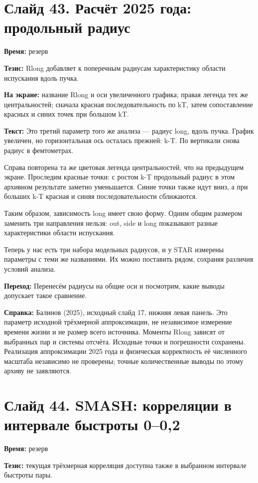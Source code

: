 \documentclass[11pt,a4paper]{article}
\begin{document}
\clearpage
\section*{Слайд 43. Расчёт 2025 года: продольный радиус}
\textbf{Время:} резерв

\textbf{Тезис:} Rlong добавляет к поперечным радиусам характеристику области испускания вдоль пучка.

\textbf{На экране:} название Rlong и оси увеличенного графика; правая легенда тех же центральностей; сначала красная последовательность по kT, затем сопоставление красных и синих точек при большом kT.

\textbf{Текст:} Это третий параметр того же анализа — радиус long, вдоль пучка. График увеличен, но горизонтальная ось осталась прежней: k-T. По вертикали снова радиус в фемтометрах.

Справа повторена та же цветовая легенда центральностей, что на предыдущем экране. Проследим красные точки: с ростом k-T продольный радиус в этом архивном результате заметно уменьшается. Синие точки также идут вниз, а при больших k-T красная и синяя последовательности сближаются.

Таким образом, зависимость long имеет свою форму. Одним общим размером заменить три направления нельзя: out, side и long показывают разные характеристики области испускания.

Теперь у нас есть три набора модельных радиусов, и у STAR измерены параметры с теми же названиями. Их можно поставить рядом, сохраняя различия условий анализа.

\textbf{Переход:} Перенесём радиусы на общие оси и посмотрим, какие выводы допускает такое сравнение.

\textbf{Справка:} Балинов (2025), исходный слайд 17, нижняя левая панель. Это параметр исходной трёхмерной аппроксимации, не независимое измерение времени жизни и не размер всего источника. Моменты Rlong зависят от выбранных пар и системы отсчёта. Исходные точки и погрешности сохранены. Реализация аппроксимации 2025 года и физическая корректность её численного масштаба независимо не проверены; точные количественные выводы по этому архиву не заявляются.

\clearpage
\section*{Слайд 44. SMASH: корреляции в интервале быстроты 0–0,2}
\textbf{Время:} резерв

\textbf{Тезис:} текущая трёхмерная корреляция доступна также в выбранном интервале быстроты пары.
\end{document}
